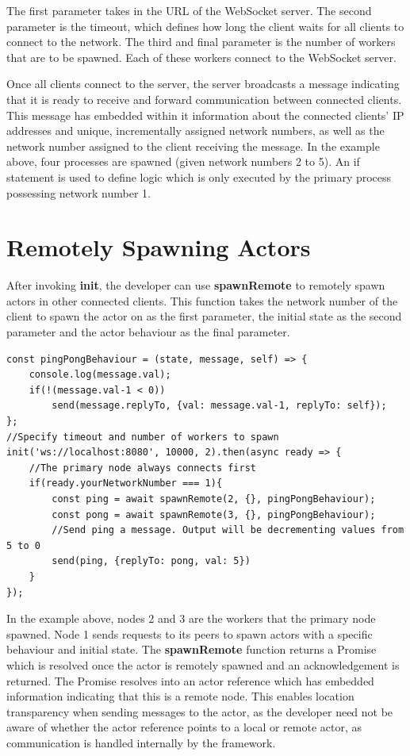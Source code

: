 \documentclass[oneside]{um-fict}
\begin{document}
The first parameter takes in the URL of the WebSocket server. The second parameter is the timeout, which defines how long the client waits for all clients to connect to the network. The third and final parameter is the number of workers that are to be spawned. Each of these workers connect to the WebSocket server.

Once all clients connect to the server, the server broadcasts a message indicating that it is ready to receive and forward communication between connected clients. This message has embedded within it information about the connected clients' IP addresses and unique, incrementally assigned network numbers, as well as the network number assigned to the client receiving the message. In the example above, four processes are spawned (given network numbers 2 to 5). An if statement is used to define logic which is only executed by the primary process possessing network number 1.

\section{Remotely Spawning Actors}
After invoking \textbf{init}, the developer can use \textbf{spawnRemote} to remotely spawn actors in other connected clients. This function takes the network number of the client to spawn the actor on as the first parameter, the initial state as the second parameter and the actor behaviour as the final parameter.
\newpage
\begin{lstlisting}
const pingPongBehaviour = (state, message, self) => {
    console.log(message.val);
    if(!(message.val-1 < 0))
        send(message.replyTo, {val: message.val-1, replyTo: self});
};
//Specify timeout and number of workers to spawn
init('ws://localhost:8080', 10000, 2).then(async ready => {
    //The primary node always connects first
    if(ready.yourNetworkNumber === 1){
        const ping = await spawnRemote(2, {}, pingPongBehaviour);
        const pong = await spawnRemote(3, {}, pingPongBehaviour);
        //Send ping a message. Output will be decrementing values from 5 to 0
        send(ping, {replyTo: pong, val: 5})
    }
});
\end{lstlisting}
In the example above, nodes 2 and 3 are the workers that the primary node spawned. Node 1 sends requests to its peers to spawn actors with a specific behaviour and initial state. The \textbf{spawnRemote} function returns a Promise which is resolved once the actor is remotely spawned and an acknowledgement is returned. The Promise resolves into an actor reference which has embedded information indicating that this is a remote node. This enables location transparency when sending messages to the actor, as the developer need not be aware of whether the actor reference points to a local or remote actor, as communication is handled internally by the framework.
\end{document}
